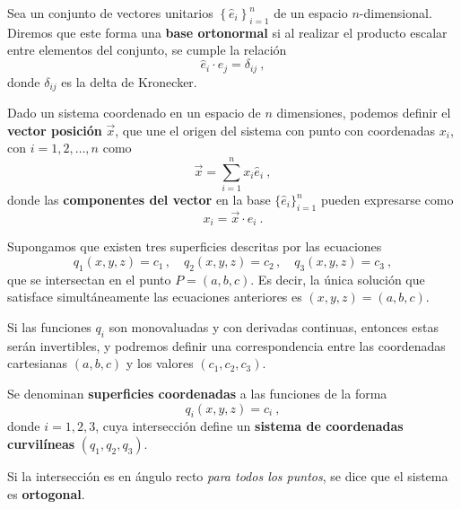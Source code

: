 \begin{defi} 
    Sea un conjunto de vectores unitarios $\left\{ \hat{e}_i\right\}_{i=1}^n$ de un espacio $n$-dimensional. Diremos que este forma una \textbf{base ortonormal} si al realizar el producto escalar entre elementos del conjunto, se cumple la relación
    \begin{equation}
        \hat{e}_i\cdot \hat{e}_j = \delta_{ij} \ ,
    \end{equation}
    donde $\delta_{ij}$ es la delta de Kronecker.
\end{defi}

\begin{defi} 
    Dado un sistema coordenado en un espacio de $n$ dimensiones, podemos definir el \textbf{vector posición} $\vec{x}$, que une el origen del sistema con punto con coordenadas $x_i$, con $i = 1, 2, \dots, n$ como
\begin{equation} \label{eq:vector-posicion}
    \vec{x} = \sum_{i=1}^n x_i \hat{e}_i \ ,
\end{equation}
donde las \textbf{componentes del vector} en la base $\{ \hat{e}_i\}_{i=1}^n$ pueden expresarse como
\begin{equation}
    x_i = \vec{x} \cdot \hat{e}_i \ .
\end{equation}
\end{defi}

Supongamos que existen tres superficies descritas por las ecuaciones
\begin{equation}
    q_1(x,y,z) = c_1 \, , \quad q_2(x,y,z) = c_2 \, , \quad q_3(x,y,z) = c_3 \ ,
\end{equation}
que se intersectan en el punto $P=(a,b,c)$. Es decir, la única solución que satisface simultáneamente las ecuaciones anteriores es $(x,y,z) = (a,b,c)$.

Si las funciones $q_i$ son monovaluadas y con derivadas continuas, entonces estas serán invertibles, y podremos definir una correspondencia entre las coordenadas cartesianas $(a,b,c)$ y los valores $(c_1,c_2,c_3)$.

\begin{defi}
    Se denominan \textbf{superficies coordenadas} a las funciones de la forma
    \begin{equation}
        q_i(x,y,z) = c_i \ ,
    \end{equation}
    donde $i = 1, 2, 3$, cuya intersección define un \textbf{sistema de coordenadas curvilíneas} $(q_1, q_2, q_3)$.
    

    Si la intersección es en ángulo recto \emph{para todos los puntos}, se dice que el sistema es \textbf{ortogonal}.
\end{defi}

